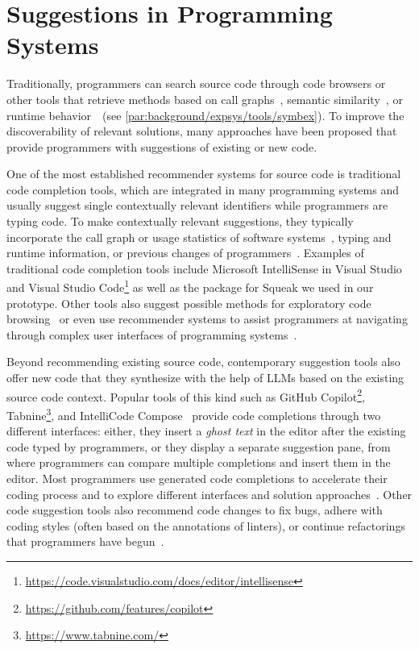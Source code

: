 
\section{Suggestions in Programming Systems}
\label{sec:related_work/suggestions}

Traditionally, programmers can search source code through code browsers or other tools that retrieve methods based on call graphs~\cites[chap.~10]{goldberg1984smalltalk}[sec.~6.2]{kraemer2010stacksplorer}{thiede2023squeak}, semantic similarity~\cite{husain2020codesearchnet}, or runtime behavior~\cite[sec.~1.8]{thiede2023squeak}~(see \cref{par:background/expsys/tools/symbex}).
To improve the discoverability of relevant solutions, many approaches have been proposed that provide programmers with suggestions of existing or new code.

One of the most established recommender systems for source code is traditional code completion tools, which are integrated in many programming systems and usually suggest single contextually relevant identifiers while programmers are typing code.
To make contextually relevant suggestions, they typically incorporate the call graph or usage statistics of software systems~\cite{thiede2022augmenting}, typing and runtime information, or previous changes of programmers~\cite{robbes2008program}.
Examples of traditional code completion tools include Microsoft IntelliSense in Visual Studio and Visual Studio Code\footnote{\url{https://code.visualstudio.com/docs/editor/intellisense}} as well as the  package for Squeak we used in our prototype.
Other tools also suggest possible methods for exploratory code browsing~\cite{robillard2005automatic,bruch2006fruit} or even use recommender systems to assist programmers at navigating through complex user interfaces of programming systems~\cite{murphy2012improving}.

Beyond recommending existing source code, contemporary suggestion tools also offer new code that they synthesize with the help of LLMs based on the existing source code context.
Popular tools of this kind such as GitHub Copilot\footnote{\url{https://github.com/features/copilot}}, Tabnine\footnote{\url{https://www.tabnine.com/}}, and IntelliCode Compose~\cite{svyatkovskiy2020intellicode} provide code completions through two different interfaces:
either, they insert a \emph{ghost text} in the editor after the existing code typed by programmers, or they display a separate suggestion pane, from where programmers can compare multiple completions and insert them in the editor.
Most programmers use generated code completions to accelerate their coding process and to explore different interfaces and solution approaches~\cite{barka2023grounded}.
Other code suggestion tools also recommend code changes to fix bugs, adhere with coding styles (often based on the annotations of linters), or continue refactorings that programmers have begun~\cite{vaithilingam2023towards}.
